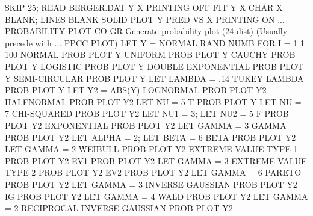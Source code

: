                                   SKIP 25; READ BERGER.DAT Y X
                                  PRINTING OFF
                                  FIT Y X
                                  CHAR X BLANK; LINES BLANK SOLID
                                  PLOT Y PRED VS X
                                  PRINTING ON
... PROBABILITY PLOT        CO-GR Generate probability plot (24 dist)
                                  (Usually precede with ... PPCC PLOT)
                                  LET Y = NORMAL RAND NUMB FOR I = 1 1 100
                                  NORMAL PROB PLOT Y
                                  UNIFORM PROB PLOT Y
                                  CAUCHY PROB PLOT Y
                                  LOGISTIC PROB PLOT Y
                                  DOUBLE EXPONENTIAL PROB PLOT Y
                                  SEMI-CIRCULAR PROB PLOT Y
                                  LET LAMBDA = .14
                                  TUKEY LAMBDA PROB PLOT Y
                                  LET Y2 = ABS(Y)
                                  LOGNORMAL PROB PLOT Y2
                                  HALFNORMAL PROB PLOT Y2
                                  LET NU = 5
                                  T PROB PLOT Y
                                  LET NU = 7
                                  CHI-SQUARED PROB PLOT Y2
                                  LET NU1 = 3; LET NU2 = 5
                                  F PROB PLOT Y2
                                  EXPONENTIAL PROB PLOT Y2
                                  LET GAMMA = 3
                                  GAMMA PROB PLOT Y2
                                  LET ALPHA = 2; LET BETA = 6
                                  BETA PROB PLOT Y2
                                  LET GAMMA = 2
                                  WEIBULL PROB PLOT Y2
                                  EXTREME VALUE TYPE 1 PROB PLOT Y2
                                  EV1 PROB PLOT Y2
                                  LET GAMMA = 3
                                  EXTREME VALUE TYPE 2 PROB PLOT Y2
                                  EV2 PROB PLOT Y2
                                  LET GAMMA = 6
                                  PARETO PROB PLOT Y2
                                  LET GAMMA = 3
                                  INVERSE GAUSSIAN PROB PLOT Y2
                                  IG PROB PLOT Y2
                                  LET GAMMA = 4
                                  WALD PROB PLOT Y2
                                  LET GAMMA = 2
                                  RECIPROCAL INVERSE GAUSSIAN PROB PLOT Y2
